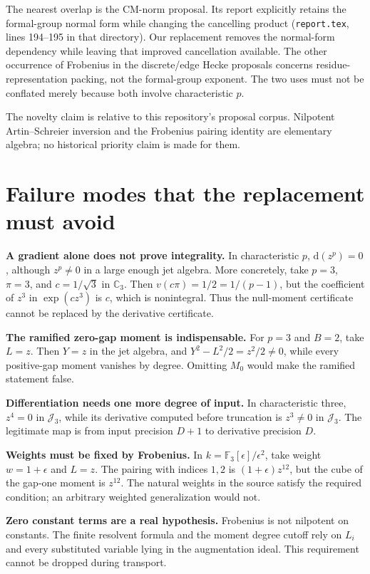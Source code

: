\documentclass[11pt,letterpaper]{article}
\theoremstyle{remark}
\newcommand{\JJ}{\mathcal J}
\newcommand{\dd}{\mathrm d}
\newcommand{\code}[1]{{\small\nolinkurl{#1}}}
\newcommand{\sectionlead}[1]{\needspace{6\baselineskip}\textbf{#1}}
\begin{document}
The nearest overlap is the CM-norm proposal. Its report explicitly retains the
formal-group normal form while changing the cancelling product
(\code{report.tex}, lines 194--195 in that directory). Our replacement removes
the normal-form dependency while leaving that improved cancellation available.
The other occurrence of Frobenius in the discrete/edge Hecke proposals concerns
residue-representation packing, not the formal-group exponent. The two uses must
not be conflated merely because both involve characteristic \(p\).

The novelty claim is relative to this repository's proposal corpus. Nilpotent
Artin--Schreier inversion and the Frobenius pairing identity are elementary
algebra; no historical priority claim is made for them.

\section{Failure modes that the replacement must avoid}
\label{app:failures}

\sectionlead{A gradient alone does not prove integrality.}
In characteristic \(p\), \(\dd(z^p)=0\), although \(z^p\ne0\) in a large
enough jet algebra. More concretely, take \(p=3\), \(\pi=3\), and
\(c=1/\sqrt3\) in \(\mathbb C_3\). Then
\(v(c\pi)=1/2=1/(p-1)\), but the coefficient of \(z^3\) in
\(\exp(cz^3)\) is \(c\), which is nonintegral. Thus the null-moment
certificate cannot be replaced by the derivative certificate.

\sectionlead{The ramified zero-gap moment is indispensable.}
For \(p=3\) and \(B=2\), take \(L=z\). Then \(Y=z\) in the jet algebra,
and \(Y^2-L^2/2=z^2/2\ne0\), while every positive-gap moment vanishes by
degree. Omitting \(M_0\) would make the ramified statement false.

\sectionlead{Differentiation needs one more degree of input.}
In characteristic three, \(z^4=0\) in \(\JJ_3\), while its derivative
computed before truncation is \(z^3\ne0\) in \(\JJ_3\). The legitimate map
is from input precision \(D+1\) to derivative precision \(D\).

\sectionlead{Weights must be fixed by Frobenius.}
In \(k=\mathbb F_3[\epsilon]/\epsilon^2\), take weight \(w=1+\epsilon\)
and \(L=z\). The pairing with indices \(1,2\) is
\((1+\epsilon)z^{12}\), but the cube of the gap-one moment is \(z^{12}\).
The natural weights in the source satisfy the required condition; an arbitrary
weighted generalization would not.

\sectionlead{Zero constant terms are a real hypothesis.}
Frobenius is not nilpotent on constants. The finite resolvent formula and the
moment degree cutoff rely on \(L_i\) and every substituted variable lying in
the augmentation ideal. This requirement cannot be dropped during transport.
\end{document}
